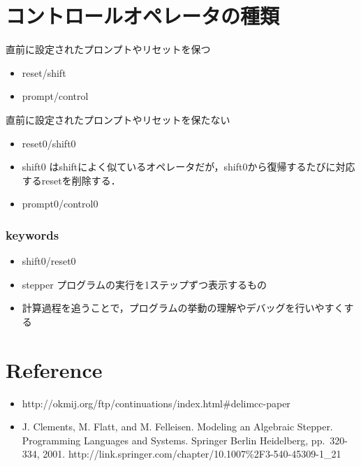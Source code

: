 \section{コントロールオペレータの種類}\label{ux30b3ux30f3ux30c8ux30edux30fcux30ebux30aaux30daux30ecux30fcux30bfux306eux7a2eux985e}

直前に設定されたプロンプトやリセットを保つ

\begin{itemize}
\tightlist
\item
  reset/shift
\item
  prompt/control
\end{itemize}

直前に設定されたプロンプトやリセットを保たない

\begin{itemize}
\tightlist
\item
  reset0/shift0
\item
  shift0
  はshiftによく似ているオペレータだが，shift0から復帰するたびに対応するresetを削除する．
\item
  prompt0/control0
\end{itemize}

\subsubsection{keywords}\label{keywords}

\begin{itemize}
\tightlist
\item
  shift0/reset0
\item
  stepper プログラムの実行を1ステップずつ表示するもの
\item
  計算過程を追うことで，プログラムの挙動の理解やデバッグを行いやすくする
\end{itemize}

\section{Reference}\label{reference}

\begin{itemize}
\tightlist
\item
  http://okmij.org/ftp/continuations/index.html\#delimcc-paper
\item
  J. Clements, M. Flatt, and M. Felleisen. Modeling an Algebraic
  Stepper. Programming Languages and Systems. Springer Berlin
  Heidelberg, pp.~320-334, 2001.
  http://link.springer.com/chapter/10.1007\%2F3-540-45309-1\_21
\end{itemize}
